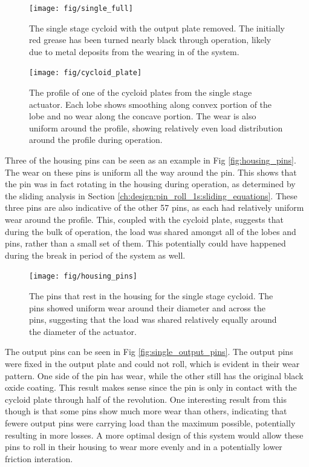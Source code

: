 \begin{figure}[t]
   \centering
   \texttt{[image: fig/single\_full]}
   \caption{The single stage cycloid with the output plate removed. The initially red grease has been turned nearly black through operation, likely due to metal deposits from the wearing in of the system.}
   \label{fig:single_full}
\end{figure}

\begin{figure}[t]
   \centering
   \texttt{[image: fig/cycloid\_plate]}
   \caption{The profile of one of the cycloid plates from the single stage actuator. Each lobe shows smoothing along convex portion of the lobe and no wear along the concave portion. The wear is also uniform around the profile, showing relatively even load distribution around the profile during operation.}
   \label{fig:cycloid_plate}
\end{figure}


Three of the housing pins can be seen as an example in Fig \ref{fig:housing_pins}. The wear on these pins is uniform all the way around the pin. This shows that the pin was in fact rotating in the housing during operation, as determined by the sliding analysis in Section \ref{ch:design:pin_roll_1s:sliding_equations}. These three pins are also indicative of the other 57 pins, as each had relatively uniform wear around the profile. This, coupled with the cycloid plate, suggests that during the bulk of operation, the load was shared amongst all of the lobes and pins, rather than a small set of them. This potentially could have happened during the break in period of the system as well. 

\begin{figure}[t]
   \centering
   \texttt{[image: fig/housing\_pins]}
   \caption{The pins that rest in the housing for the single stage cycloid. The pins showed uniform wear around their diameter and across the pins, suggesting that the load was shared relatively equally around the diameter of the actuator.}
   \label{fig:single_housing_pins}
\end{figure}


The output pins can be seen in Fig \ref{fig:single_output_pins}. The output pins were fixed in the output plate and could not roll, which is evident in their wear pattern. One side of the pin has wear, while the other still has the original black oxide coating. This result makes sense since the pin is only in contact with the cycloid plate through half of the revolution. One interesting result from this though is that some pins show much more wear than others, indicating that fewere output pins were carrying load than the maximum possible, potentially resulting in more losses. A more optimal design of this system would allow these pins to roll in their housing to wear more evenly and in a potentially lower friction interation. 

